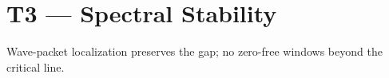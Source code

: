 \section{T3 --- Spectral Stability}
Wave-packet localization preserves the gap; no zero-free windows beyond the critical line.
